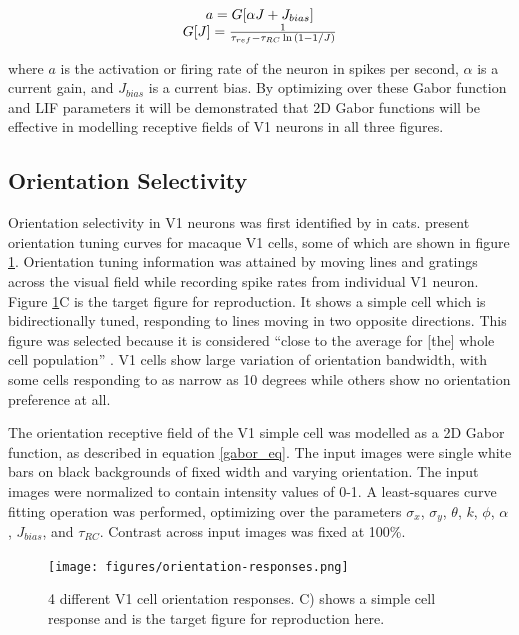 \documentclass{article}
\begin{document}
\begin{equation}
\begin{matrix}
a = G[\alpha J + J_{bias}] \\ 
G[J] = {1 \over \tau_{ref} - \tau_{RC}\ln{(1 - 1/J)} } 
\label{LIF}
\end{matrix}
\end{equation}

where $a$ is the activation or firing rate of the neuron in spikes per second, $\alpha$ is a current gain, and $J_{bias}$ is a current bias. By optimizing over these Gabor function and LIF parameters it will be demonstrated that 2D Gabor functions will be effective in modelling receptive fields of V1 neurons in all three figures.

\subsection{Orientation Selectivity}

Orientation selectivity in V1 neurons was first identified by \citet{hw59} in cats. \citet{devalois82} present orientation tuning curves for macaque V1 cells, some of which are shown in figure \ref{fig:otuning}. Orientation tuning information was attained by moving lines and gratings across the visual field while recording spike rates from individual V1 neuron. Figure \ref{fig:otuning}C is the target figure for reproduction. It shows a simple cell which is bidirectionally tuned, responding to lines moving in two opposite directions. This figure was selected because it is considered ``close to the average for [the] whole cell population'' \citep{devalois82}. V1 cells show large variation of orientation bandwidth, with some cells responding to as narrow as 10 degrees while others show no orientation preference at all. 

The orientation receptive field of the V1 simple cell was modelled as a 2D Gabor function, as described in equation \ref{gabor_eq}. The input images were single white bars on black backgrounds of fixed width and varying orientation. The input images were normalized to contain intensity values of 0-1. A least-squares curve fitting operation was performed, optimizing over the parameters $\sigma_x$, $\sigma_y$, $\theta$, $k$, $\phi$, $\alpha$, $J_{bias}$, and $\tau_{RC}$. Contrast across input images was fixed at 100\%.

\begin{figure}[h]
\begin{center}
\texttt{[image: figures/orientation-responses.png]}
\caption{4 different V1 cell orientation responses. C) shows a simple cell response and is the target figure for reproduction here. \cite{devalois82}}
\label{fig:otuning}
\end{center}
\end{figure}
\end{document}
